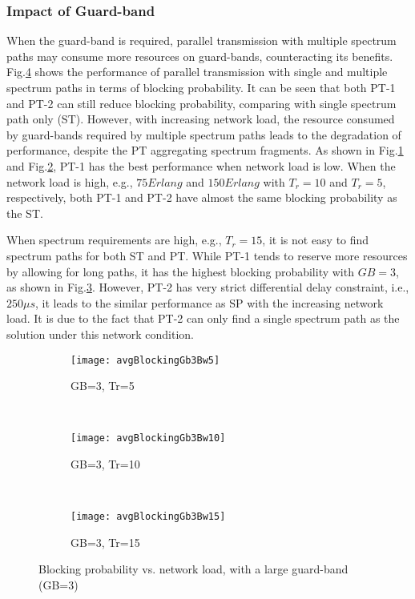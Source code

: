 \documentclass[conference]{IEEEtran}
\begin{document}
\subsubsection{Impact of Guard-band}
When the guard-band is required, parallel transmission with multiple spectrum paths 
may consume more resources on guard-bands, counteracting its benefits. Fig.\ref{fig:gb3} shows the performance of 
parallel transmission with single and multiple spectrum paths in terms of blocking probability.  It can be seen that both 
PT-1 and PT-2 can still reduce blocking probability, comparing with single spectrum path only (ST). However, with 
increasing network load, the resource consumed by guard-bands required by multiple spectrum paths  leads to the 
degradation of performance, despite the PT aggregating spectrum fragments. As shown in Fig.\ref{fig:gb3-1} and 
Fig.\ref{fig:gb3-2}, PT-1 has the best performance when network load is low. When the network load is high, e.g., 
$75Erlang$ and $150Erlang$ with $T_r=10$ and $T_r=5$, respectively, both PT-1 and PT-2 have almost the same 
blocking probability as the ST. 

When spectrum requirements are high, e.g., $T_r=15$, it is not easy to find spectrum paths for both ST and PT. 
While PT-1 tends to reserve more resources by allowing for long paths, it has the highest blocking probability with  $GB=3$, as shown in Fig.\ref{fig:gb3-3}. However, PT-2  has very strict differential delay constraint, i.e., $250\mu s$, it leads to the similar performance as SP with the increasing network load.  It is due to the fact that PT-2 can only find a single spectrum  path as the solution under this network condition. 
 \begin{figure}
        \centering
        \begin{subfigure}[b]{0.47\textwidth}
                \centering
                \texttt{[image: avgBlockingGb3Bw5]}
                \caption{ GB=3, Tr=5 }
                \label{fig:gb3-1}
        \end{subfigure}  \\
\begin{subfigure}[b]{0.47\textwidth}
                \centering
                \texttt{[image: avgBlockingGb3Bw10]}
                \caption{ GB=3, Tr=10}
                \label{fig:gb3-2}
        \end{subfigure}  \\
\begin{subfigure}[b]{0.47\textwidth}
                \centering
                \texttt{[image: avgBlockingGb3Bw15]}
                \caption{GB=3, Tr=15}
                \label{fig:gb3-3}
        \end{subfigure}
        \caption{Blocking probability vs. network load, with a large guard-band (GB=3)}\label{fig:gb3}
\end{figure} 
\end{document}
